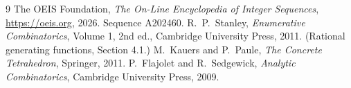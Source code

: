 \documentclass[11pt,a4paper]{article}
\theoremstyle{plain}
\theoremstyle{definition}
\begin{document}
\begin{thebibliography}{9}
 The OEIS Foundation, \emph{The On-Line Encyclopedia of Integer
Sequences}, \url{https://oeis.org}, 2026. Sequence A202460.
 R.~P.~Stanley, \emph{Enumerative Combinatorics}, Volume 1, 2nd ed.,
Cambridge University Press, 2011. (Rational generating functions, Section 4.1.)
 M.~Kauers and P.~Paule, \emph{The Concrete Tetrahedron}, Springer, 2011.
 P.~Flajolet and R.~Sedgewick, \emph{Analytic Combinatorics}, Cambridge
University Press, 2009.
\end{thebibliography}
\end{document}
